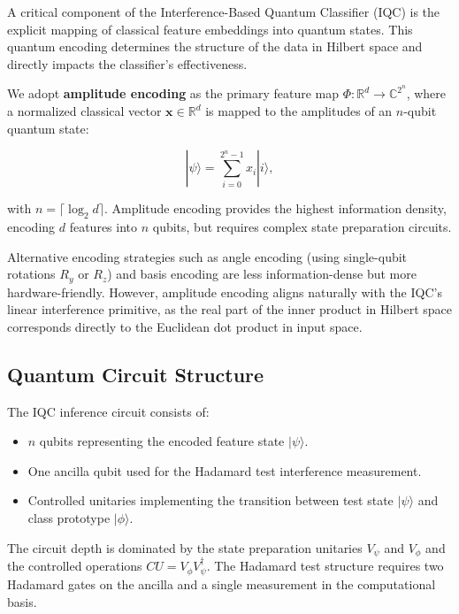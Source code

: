 \documentclass[conference]{IEEEtran}
\begin{document}
A critical component of the Interference-Based Quantum Classifier (IQC) is the explicit mapping of classical feature embeddings into quantum states. This quantum encoding determines the structure of the data in Hilbert space and directly impacts the classifier's effectiveness.

We adopt \textbf{amplitude encoding} as the primary feature map $\Phi: \mathbb{R}^d \rightarrow \mathbb{C}^{2^n}$, where a normalized classical vector $\mathbf{x} \in \mathbb{R}^d$ is mapped to the amplitudes of an $n$-qubit quantum state:

\begin{equation}
|\psi\rangle = \sum_{i=0}^{2^n - 1} x_i |i\rangle,
\end{equation}

with $n = \lceil \log_2 d \rceil$. Amplitude encoding provides the highest information density, encoding $d$ features into $n$ qubits, but requires complex state preparation circuits.

Alternative encoding strategies such as angle encoding (using single-qubit rotations $R_y$ or $R_z$) and basis encoding are less information-dense but more hardware-friendly. However, amplitude encoding aligns naturally with the IQC's linear interference primitive, as the real part of the inner product in Hilbert space corresponds directly to the Euclidean dot product in input space.

\subsection{Quantum Circuit Structure}

The IQC inference circuit consists of:

\begin{itemize}
    \item $n$ qubits representing the encoded feature state $|\psi\rangle$.
    \item One ancilla qubit used for the Hadamard test interference measurement.
    \item Controlled unitaries implementing the transition between test state $|\psi\rangle$ and class prototype $|\phi\rangle$.
\end{itemize}

The circuit depth is dominated by the state preparation unitaries $V_\psi$ and $V_\phi$ and the controlled operations $CU = V_\phi V_\psi^\dagger$. The Hadamard test structure requires two Hadamard gates on the ancilla and a single measurement in the computational basis.
\end{document}
